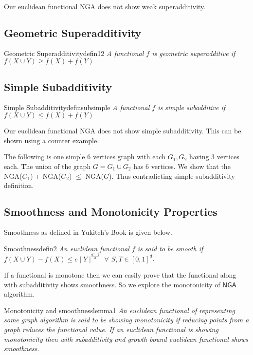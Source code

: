 \documentclass{article}
\begin{document}
Our euclidean functional \textsf{NGA} does not show weak superadditivity.

\subsection{Geometric Superadditivity}

\begin{define}{Geometric Superadditivity}{defin12}
    \textit{A functional $f$ is geometric superadditive if $f(X \cup Y) \geq f(X) + f(Y)$}
\end{define}


\subsection{Simple Subadditivity}
\begin{define}{Simple Subadditivity}{definsubsimple}
    \textit{A functional $f$ is simple subadditive if $f(X \cup Y) \leq f(X) + f(Y)$}
\end{define}

Our euclidean functional \textsf{NGA} does not show simple subadditivity. This
can be shown using a counter example.

The following is one simple $6$ vertices graph with each $G_1, G_2$ having 3
vertices each. The union of the graph $G = G_1 \cup G_2$ has $6$ vertices. We
show that the \textsf{NGA}($G_1$) + \textsf{NGA}($G_2$) $\leq$
\textsf{NGA}($G$). Thus contradicting simple subadditivity definition.



\subsection{Smoothness and Monotonicity Properties}

Smoothness as defined in Yukitch's Book is given below.

\begin{define}{Smoothness}{defin2}
    \textit{An euclidean functional $f$ is said to be smooth if $f(X \cup Y) - f(X)\leq c\mid Y\mid^{\frac{d-1}{d}}$
        $\forall$ $S, T \in [0,1]^d$}.
\end{define}

If a functional is monotone then we can easily prove that the functional along
with subadditivity shows smoothness. So we explore the monotonicity of
$\textsf{NGA}$ algorithm.

\begin{lemma}{Monotonicity and smoothness}{lemma1}
    \textit{An euclidean functional of representing some graph algorithm is said to be showing monotonicity if reducing points from a graph reduces the functional value.
        If an euclidean functional is showing monotonicity then with subadditivity and growth bound euclidean functional shows smoothness.}
\end{lemma}
\end{document}
